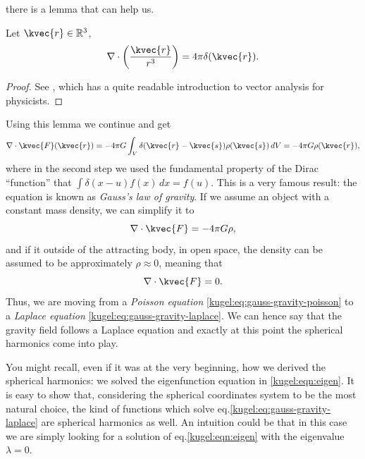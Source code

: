 there is a lemma that can help us.
\begin{lemma}
  Let $\kvec{r} \in \mathbb{R}^3$,
  \label{kugel:thm:div-and-dirac}
  \begin{equation*}
    \nabla \cdot \left(
      \frac{\kvec{r}}{r^3}
    \right) = 4\pi \delta(\kvec{r}).
  \end{equation*}
\end{lemma}
\begin{proof}
  See \cite{griffiths_introduction_2015}, which has a quite readable
  introduction to vector analysis for physicists.
\end{proof}
Using this lemma we continue and get
\begin{equation*}
  \nabla \cdot \kvec{F}(\kvec{r})
    = -4\pi G \int_{V} \delta(\kvec{r}-\kvec{s}) \rho(\kvec{s}) \, dV 
    = -4\pi G \rho(\kvec{r}),
\end{equation*}
where in the second step we used the fundamental property of the Dirac
``function'' that $\int \delta (x - u) f(x) \, dx = f(u)$.  This is a very famous
result: the equation is known as \emph{Gauss's law of gravity}.  If we assume an
object with a constant mass density, we can simplify it to
\begin{equation}
  \label{kugel:eq:gauss-gravity-poisson}
  \nabla \cdot \kvec{F} = -4\pi G \rho,
\end{equation}
and if it outside of the attracting body, in open space, the density can be
assumed to be approximately $\rho \approx 0$, meaning that
\begin{equation}
  \label{kugel:eq:gauss-gravity-laplace}
  \nabla \cdot \kvec{F} = 0.
\end{equation}
Thus, we are moving from a \emph{Poisson equation}
\eqref{kugel:eq:gauss-gravity-poisson} to a \emph{Laplace equation}
\eqref{kugel:eq:gauss-gravity-laplace}.  We can hence say that the gravity field
follows a Laplace equation and exactly at this point the spherical harmonics
come into play. 

You might recall, even if it was at the very beginning, how we derived the spherical harmonics: we solved the eigenfunction equation in \eqref{kugel:eqn:eigen}. 
It is easy to show that, considering the spherical coordinates system to be the most natural choice, the kind of functions which solve 
eq.\eqref{kugel:eq:gauss-gravity-laplace} are spherical harmonics as well. An intuition could be that in this case we are simply 
looking for a solution of eq.\eqref{kugel:eqn:eigen} with the eigenvalue $\lambda=0$.

